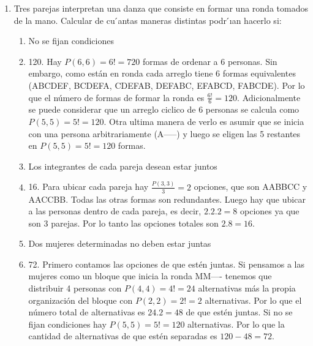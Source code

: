\documentclass[a4paper]{article}
\newcommand{\answer}{\item[**]}
\newcommand{\exercise}{\item}
\begin{document}
\begin{enumerate}
\begin{enumerate} [label=(\alph*)]
		\item ¿Cuántos números distintos de 5 cifras y mayores que $10^4$ se pueden formar con las cifras 2, 7, y 0, si el 2 y el 7 se repiten 2 veces 
		\answer 24. Hay 2 opciones, que el número sea 2---- o 7----. Para el primer caso hay $\frac{P(4,4)}{2!}=\frac{4!}{2!}=12$ opciones ya que el 7 está repetido. Para el segundo caso hay $\frac{P(4,4)}{2!}=\frac{4!}{2!}=12$ opciones ya que el 2 está repetido. El total de opciones es $12+12=24$.

		\item ¿Cuántos números distintos de 3 cifras pueden formarse con los dígitos del 1 al 8, si estos pueden repetirse?
		\answer 512. Hay 8 opciones para cada cifra, por lo que el total de opciones es $8.8.8=8^3=512$, o bien es una permutación con reposición $P^R(8,3)=8^3=512$.

	\end{enumerate}

	\exercise Tres parejas interpretan una danza que consiste en formar una ronda tomados de la mano. Calcular de cu ́antas maneras distintas podr ́ıan hacerlo si:
	\begin{enumerate} [label=(\alph*)]
		\item No se fijan condiciones
		\answer 120. Hay $P(6,6)=6!=720$ formas de ordenar a 6 personas. Sin embargo, como están en ronda cada arreglo tiene 6 formas equivalentes (ABCDEF, BCDEFA, CDEFAB, DEFABC, EFABCD, FABCDE). Por lo que el número de formas de formar la ronda es $\frac{6!}{6}=120$. Adicionalmente se puede considerar que un arreglo ciclico de 6 personas se calcula como $P(5,5)=5!=120$. Otra ultima manera de verlo es asumir que se inicia con una persona arbitrariamente (A-----) y luego se eligen las 5 restantes en $P(5,5)=5!=120$ formas.

		\item Los integrantes de cada pareja desean estar juntos
		\answer 16. Para ubicar cada pareja hay $\frac{P(3,3)}{3}=2$ opciones, que son AABBCC y AACCBB. Todas las otras formas son redundantes. Luego hay que ubicar a las personas dentro de cada pareja, es decir, $2.2.2=8$ opciones ya que son 3 parejas. Por lo tanto las opciones totales son $2.8=16$.
		
		\item Dos mujeres determinadas no deben estar juntas
		\answer 72. Primero contamos las opciones de que estén juntas. Si pensamos a las mujeres como un bloque que inicia la ronda MM---- tenemos que distribuir 4 personas con $P(4,4)=4!=24$ alternativas más la propia organización del bloque con $P(2,2)=2!=2$ alternativas. Por lo que el número total de alternativas es $24.2=48$ de que estén juntas. Si no se fijan condiciones hay $P(5,5)=5!=120$ alternativas. Por lo que la cantidad de alternativas de que estén separadas es $120-48=72$.


\end{enumerate}
\end{enumerate}
\end{document}
